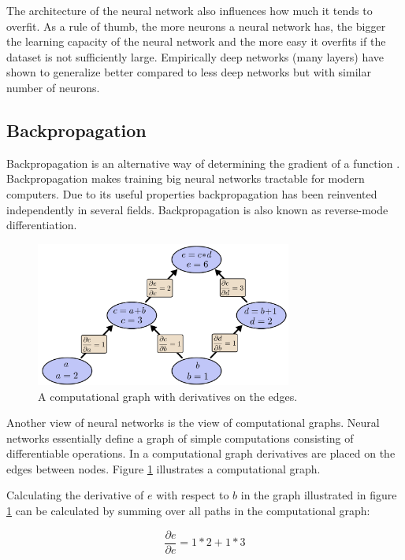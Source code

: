 \documentclass[draft,final,oneside]{vutinfth} %
\begin{document}
The architecture of the neural network also influences how much it tends to overfit. As a rule of thumb, the more neurons a neural network has, the bigger the learning capacity of the neural network and the more easy it overfits if the dataset is not sufficiently large. Empirically deep networks (many layers) have shown to generalize better compared to less deep networks but with similar number of neurons.

\subsection{Backpropagation}

Backpropagation is an alternative way of determining the gradient of a function \cite{colahbackprop}. Backpropagation makes training big neural networks tractable for modern computers. Due to its useful properties backpropagation has been reinvented independently in several fields. \cite{Griewank2012WhoIT} Backpropagation is also known as reverse-mode differentiation.

\begin{figure}[ht]
	\centering
  	\includegraphics[width=0.75\textwidth]{graphics/computationgraph.png}
	\caption{A computational graph with derivatives on the edges. \cite{colahbackprop}}
	\label{fig:computationgraph}
\end{figure}


Another view of neural networks is the view of computational graphs. Neural networks essentially define a graph of simple computations consisting of differentiable operations. In a computational graph derivatives are placed on the edges between nodes. Figure \ref{fig:computationgraph} illustrates a computational graph.

Calculating the derivative of $e$ with respect to $b$ in the graph illustrated in figure \ref{fig:computationgraph} can be calculated by summing over all paths in the computational graph:

\begin{equation}
\frac{\partial e}{\partial e} = 1 * 2 + 1  * 3
\end{equation}
\end{document}
